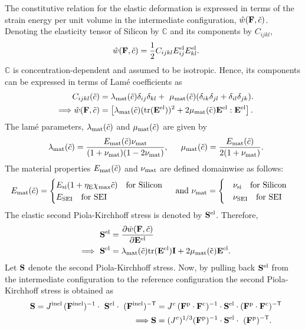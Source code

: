 The constitutive relation for the elastic deformation is expressed in terms of the strain energy per unit volume in the intermediate configuration, $\hat{w}(\mathbf{F}, \tilde{c})$. Denoting the elasticity tensor of Silicon by $\mathbb{C}$ and its components by $C_{ijkl}$,
\begin{gather}
    \hat{w}(\F, \tc) = \fc{1}{2} C_{ijkl} \Eel{ij} \Eel{kl}.
\end{gather}
$\mathbb{C}$ is concentration-dependent and assumed to be isotropic. Hence, its components can be expressed in terms of Lam\'{e} coefficients as 
\begin{align}
 C_{ijkl}(\tc) &= \lambda_{\rm{mat}}(\tc)\delta_{ij} \delta_{kl} +  \mu_{\rm{mat}}(\tc)(\delta_{ik} \delta_{jl} + \delta_{il} \delta_{jk}). \\
    \implies \hat{w}(\F, \tc) &= \left[\lamSic (\tr{\E^\el})^2 + 2 \muSic \E^{\el}:\E^{\el}\right].
\end{align}
The lam\'{e} parameters, $\lambda_{\rm{mat}}(\tilde{c})$ and $\mu_{\rm{mat}}(\tilde{c})$ are given by
\begin{align}
    \lamSic = \fc{\EMatc \nuMat}{(1+\nuMat)(1-2\nuMat)},
    && \muSic = \fc{\EMatc}{2(1+\nuMat)}. \nonumber
\end{align}
The material properties $E_{\rm{mat}}(\tilde{c})$ and $\nu_{\rm{mat}}$ are defined domainwise as follows:
\[\EMatc = \begin{cases}
 E_{\text{si}}(1 + \eta_{\rm{E}} \chi_{\rm{max}} \tc) \text{\quad for Silicon} \\
 E_{\rm{SEI}} \text{\quad for SEI }
\end{cases} \text{ and }
\nuMat = \begin{cases}
     \nu_{\si} \text{\quad for Silicon} \\
     \nu_{\rm{SEI}} \text{\quad for SEI }
\end{cases}\]
The elastic second Piola-Kirchhoff stress is denoted by $\mathbf{S}^{\rm{el}}$. Therefore, 
\begin{align}
    \PKS^\el &= \pdiff{\hat{w}(\F, \tc)}{\E^{\el}}\nonumber \\
    \implies  \PKS^\el &= \lamSic \tr{\E^\el}\I + 2 \muSic \E^\el. \label{eq:Sel_tensor}
\end{align}
Let $\mathbf{S}$ denote the second Piola-Kirchhoff stress. Now, by pulling back $\mathbf{S}^{{\rm{el}}}$ from the intermediate configuration to the reference configuration \citep{2010Gurtin} the second Piola-Kirchhoff stress is obtained as
\begin{align}
    \PKS = J^{\inel} \, \inv{\F^\inel} \cdot  \PKS^\el \cdot  \invT{\F^\inel} &= \jc \, \inv{\F^{\p} \cdot \F^{\c}} \cdot \PKS^{\el} \cdot \invT{\F^\p \cdot \F^\c}\nonumber\\
    \implies \PKS &= (\jc)^{1/3} \inv{\F^\p} \cdot \PKS^{\el} \cdot  \invT{\F^\p}.\label{eq:S_tensor}
\end{align}
